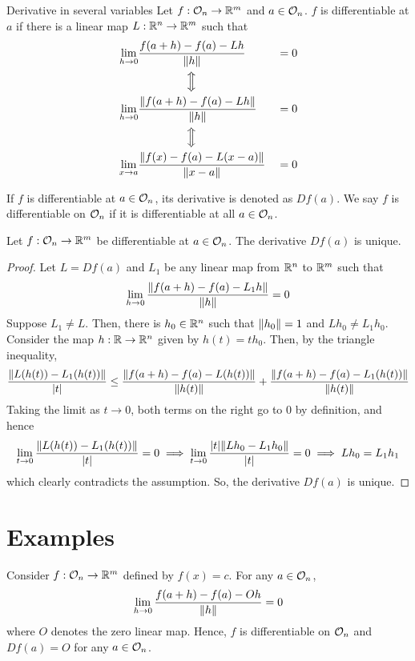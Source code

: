 \documentclass[../Analysis-3.tex]{subfiles}
\begin{document}
\begin{Def}{Derivative in several variables}{}
  Let $ f : \mathcal{O}_{n} \to \mathbb{R}^m $ and $ a \in \mathcal{O}_{n} $. $ f $ is differentiable at $ a $ if there is a linear map $ L : \mathbb{R}^n \to \mathbb{R}^m $ such that
  \begin{alignat*}{2}
    \lim_{h \to 0} & \frac{f(a+h)-f(a)-Lh}{\norm{h}}            &  & = 0 \\
                   & \qquad \qquad \,\,\Big \Updownarrow                 \\
    \lim_{h \to 0} & \frac{\norm{f(a+h)-f(a)-Lh}}{\norm{h}}     &  & = 0 \\
                   & \qquad \qquad \,\, \Big \Updownarrow                \\
    \lim_{x \to a} & \frac{\norm{f(x)-f(a)-L(x-a)}}{\norm{x-a}} &  & = 0 \\
  \end{alignat*}

  If $ f $ is differentiable at $ a \in \mathcal{O}_{n} $, its derivative is denoted as $ Df(a) $. We say $ f $ is differentiable on $ \mathcal{O}_{n} $ if it is differentiable at all $ a \in \mathcal{O}_{n} $.
\end{Def}

\begin{Thm}{}{}
  Let $ f: \mathcal{O}_{n} \to \mathbb{R}^m $ be differentiable at $ a \in \mathcal{O}_{n} $. The derivative $ Df(a) $ is unique.
\end{Thm}
\begin{proof}
  Let $ L = Df(a) $ and $ L_1 $ be any linear map from $ \mathbb{R}^n $ to $ \mathbb{R}^m $ such that
  \[ \lim_{h \to 0} \frac{\norm{f(a+h)-f(a)-L_1h}}{\norm{h}} = 0 \]
  Suppose $ L_1 \neq L $. Then, there is $ h_0 \in \mathbb{R}^n $ such that $ \norm{h_0} = 1 $ and $ Lh_0 \neq L_1h_0 $. Consider the map $ h: \mathbb{R} \to \mathbb{R}^n $ given by $ h(t) = th_0 $. Then, by the triangle inequality,
  \[ \frac{\norm{L(h(t))-L_1(h(t))}}{\abs{t}} \leq \frac{\norm{f(a+h)-f(a)-L(h(t))}}{\norm{h(t)}} + \frac{\norm{f(a+h)-f(a)-L_1(h(t))}}{\norm{h(t)}} \]
  Taking the limit as $ t \to 0 $, both terms on the right go to 0 by definition, and hence
  \[ \lim_{t \to 0} \frac{\norm{L(h(t))-L_1(h(t))}}{\abs{t}} = 0 \implies \lim_{t \to 0} \frac{\abs{t}\norm{Lh_0-L_1h_0}}{\abs{t}} = 0 \implies Lh_0 = L_1h_1\]
  which clearly contradicts the assumption. So, the derivative $ Df(a) $ is unique.
\end{proof}

\section{Examples}
\begin{Eg}{}{}
  Consider $ f: \mathcal{O}_{n} \to\mathbb{R}^m $ defined by $ f(x) = c $. For any $ a \in \mathcal{O}_{n} $,
  \[ \lim_{h \to 0} \frac{f(a+h)-f(a)-Oh}{\norm{h}} = 0 \]
  where $ O $ denotes the zero linear map. Hence, $ f $ is differentiable on $ \mathcal{O}_{n} $ and $ Df(a) = O $ for any $ a \in \mathcal{O}_{n} $.
\end{Eg}
\end{document}
